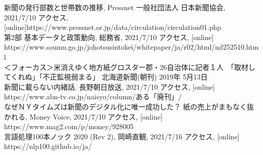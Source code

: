 \documentclass[openany, 11pt,papersize,dvipdfm]{jsbook}
\begin{document}
\begin{thebibliography}{9}
  新聞の発行部数と世帯数の推移, Pressnet 一般社団法人 日本新聞協会,  2021/7/10 アクセス, [online]https://www.pressnet.or.jp/data/circulation/circulation01.php\\
  第2部 基本データと政策動向, 総務省, 2021/7/10 アクセス, [online]  https://www.soumu.go.jp/johotsusintokei/whitepaper/ja/r02/html/nd252510.html\\
  ＜フォーカス＞米消えゆく地方紙グロスター郡・26自治体に記者１人　「取材してくれぬ」「不正監視弱まる」 北海道新聞(朝刊) 2019年 5月13日\\
  新聞に載らない内緒話, 長野朝日放送, 2021/7/10 アクセス, [online] https://www.abn-tv.co.jp/naisyo/column/ある「廃刊」/\\
  なぜＮＹタイムズは新聞のデジタル化に唯一成功した？ 紙の売上がまもなく抜かれる, Money Voice, 2021/7/10 アクセス, [online] https://www.mag2.com/p/money/928005\\
  言語処理100本ノック 2020 (Rev 2), 岡崎直観, 2021/7/16 アクセス, [online] https://nlp100.github.io/ja/
\end{thebibliography}
\end{document}
